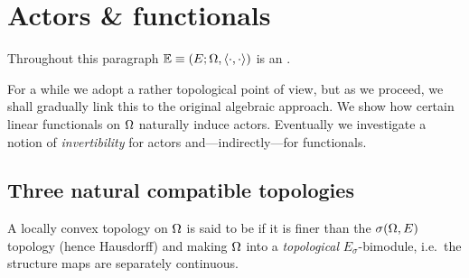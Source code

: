 \section{Actors \& functionals}
\label{par:actors_and_functionals}


Throughout this paragraph $\mathbb{E} \equiv (E; \Omega, \langle\cdot, \cdot\rangle)$ is an \context\@.

\begin{abs_chp} 
For a while we adopt a rather topological point of view, but as we proceed,
we shall gradually link this to the original algebraic approach.
We show how certain linear functionals on $\Omega$ naturally induce actors.
Eventually we investigate a notion of {\em invertibility\/} for actors
and---indirectly---for functionals.
\end{abs_chp}




\subsection{Three natural compatible topologies}

\begin{defn} \label{def:EEcompatible}
  A locally convex topology on $\Omega$ is said to be  if
  it is finer than the $\sigma(\Omega,E)$ topology (hence Hausdorff)
  and making $\Omega$ into a {\em topological\/} $E_\sigma$-bimodule,
  i.e.\ the structure maps are separately continuous.
\end{defn}

